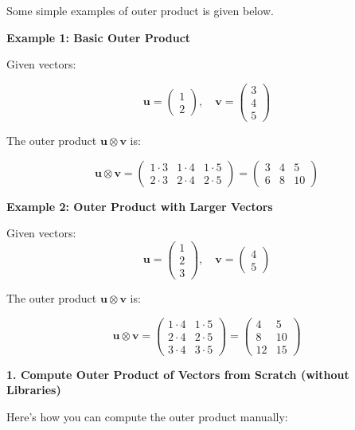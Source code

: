 \documentclass[
  letterpaper,
  DIV=11,
  numbers=noendperiod]{scrreprt}
\theoremstyle{plain}
\theoremstyle{definition}
\theoremstyle{remark}
\begin{document}
Some simple examples of outer product is given below.

\textbf{Example 1: Basic Outer Product}

Given vectors:

\[\mathbf{u} = \begin{pmatrix}
1 \\
2
\end{pmatrix}, \quad
\mathbf{v} = \begin{pmatrix}
3 \\
4 \\
5\end{pmatrix}\]

The outer product \(\mathbf{u} \otimes \mathbf{v}\) is:

\[\mathbf{u} \otimes \mathbf{v} = \begin{pmatrix}
1 \cdot 3 & 1 \cdot 4 & 1 \cdot 5 \\
2 \cdot 3 & 2 \cdot 4 & 2 \cdot 5
\end{pmatrix} = \begin{pmatrix}
3 & 4 & 5 \\
6 & 8 & 10
\end{pmatrix}\]

\textbf{Example 2: Outer Product with Larger Vectors}

Given vectors: \[\mathbf{u} = \begin{pmatrix}
1 \\
2 \\
3
\end{pmatrix}, \quad
\mathbf{v} = \begin{pmatrix}
4 \\
5
\end{pmatrix}\]

The outer product \(\mathbf{u} \otimes \mathbf{v}\) is:

\[\mathbf{u} \otimes \mathbf{v} = \begin{pmatrix}
1 \cdot 4 & 1 \cdot 5 \\
2 \cdot 4 & 2 \cdot 5 \\
3 \cdot 4 & 3 \cdot 5
\end{pmatrix} = \begin{pmatrix}
4 & 5 \\
8 & 10 \\
12 & 15
\end{pmatrix}\]

\textbf{1. Compute Outer Product of Vectors from Scratch (without
Libraries)}

Here's how you can compute the outer product manually:
\end{document}
